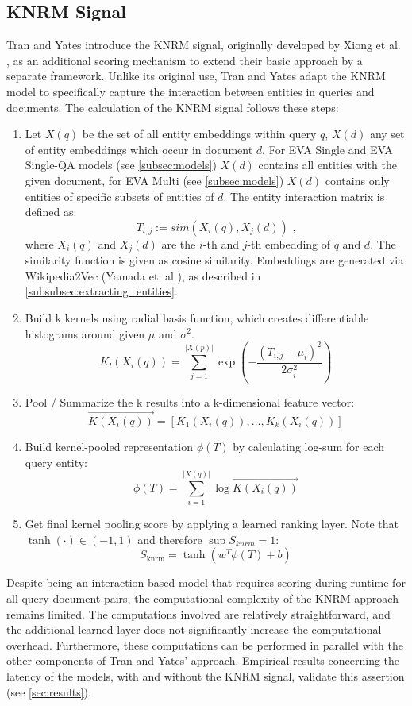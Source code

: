 \subsection{KNRM Signal}\label{subsec:knrm}

Tran and Yates introduce the KNRM signal, originally developed by Xiong et al. \cite{xiong2017end}, as an additional scoring mechanism to extend their basic approach by a separate framework. Unlike its original use, Tran and Yates adapt the KNRM model to specifically capture the interaction between entities in queries and documents. The calculation of the KNRM signal follows these steps:

\begin{enumerate}
    \item Let $X(q)$ be the set of all entity embeddings within query $q$, $X(d)$ any set of entity embeddings which occur in document $d$. For EVA Single and EVA Single-QA models (see \autoref{subsec:models}) $X(d)$ contains all entities with the given document, for EVA Multi (see \autoref{subsec:models}) $X(d)$ contains only entities of specific subsets of entities of $d$. The entity interaction matrix is defined as: 
    \[T_{i,j} := sim(X_i(q), X_j(d)) \text{~,}\]
    where $X_i(q)$ and $X_j(d)$ are the $i$-th and $j$-th embedding of $q$ and $d$. The similarity function is given as cosine similarity. Embeddings are generated via Wikipedia2Vec (Yamada et. al \cite{yamada2018wikipedia2vec}), as described in \autoref{subsubsec:extracting_entities}.
    \item Build k kernels using radial basis function, which creates differentiable histograms around given $\mu$ and $\sigma^2$.
    \[ K_l(X_i(q)) = \sum_{j=1}^{|X(p)|}\exp\left(-\frac{(T_{i,j}-\mu_i)^2}{2\sigma_i^2}\right)\]
    \item Pool / Summarize the k results into a k-dimensional feature vector: \[\overrightarrow{K(X_i(q))} = [K_1(X_i(q)), \ldots, K_k(X_i(q))]\]
    \item Build kernel-pooled representation $\phi(T)$ by calculating log-sum for each query entity: \[\phi(T) = \sum_{i=1}^{|X(q)|} \log \overrightarrow{K(X_i(q))}\]
    \item Get final kernel pooling score by applying a learned ranking layer. Note that $\tanh(\cdot) \in (-1, 1)$ and therefore $\sup S_{knrm} = 1$: \[ S_{\text{knrm}} = \tanh(w^T\phi(T) + b) \]
  \end{enumerate}

Despite being an interaction-based model that requires scoring during runtime for all query-document pairs, the computational complexity of the KNRM approach remains limited. The computations involved are relatively straightforward, and the additional learned layer does not significantly increase the computational overhead. Furthermore, these computations can be performed in parallel with the other components of Tran and Yates' approach. Empirical results concerning the latency of the models, with and without the KNRM signal, validate this assertion (see \autoref{sec:results}).

